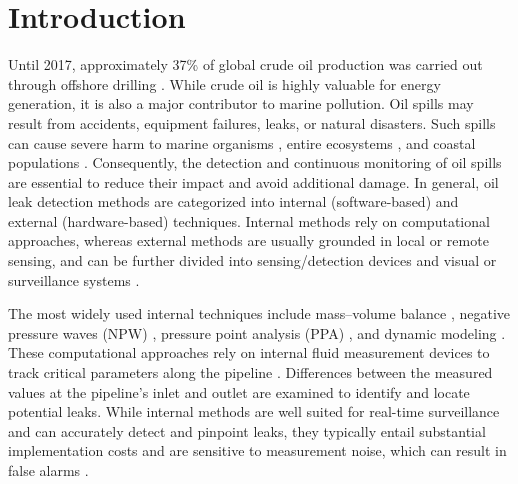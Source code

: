\documentclass{iopjournal}
\begin{document}
\section{Introduction}
Until 2017, approximately 37\% of global crude oil production was carried out through offshore drilling \cite{energyocean}. While crude oil is highly valuable for energy generation, it is also a major contributor to marine pollution. Oil spills may result from accidents, equipment failures, leaks, or natural disasters. Such spills can cause severe harm to marine organisms \cite{Almeda2014}, entire ecosystems \cite{Soloneski2015}, and coastal populations \cite{Albers1982}. Consequently, the detection and continuous monitoring of oil spills are essential to reduce their impact and avoid additional damage. In general, oil leak detection methods are categorized into internal (software-based) and external (hardware-based) techniques. Internal methods rely on computational approaches, whereas external methods are usually grounded in local or remote sensing, and can be further divided into sensing/detection devices and visual or surveillance systems \cite{cramer2015}.

The most widely used internal techniques include mass–volume balance \cite{martins2010assessment}, negative pressure waves (NPW) \cite{hou2013pipeline}, pressure point analysis (PPA) \cite{bin2011pressure}, and dynamic modeling \cite{vitkovsky2007experimental}. These computational approaches rely on internal fluid measurement devices to track critical parameters along the pipeline \cite{ostapkowicz2016leak}. Differences between the measured values at the pipeline’s inlet and outlet are examined to identify and locate potential leaks. While internal methods are well suited for real-time surveillance and can accurately detect and pinpoint leaks, they typically entail substantial implementation costs and are sensitive to measurement noise, which can result in false alarms \cite{reda2024roadmap}.
\end{document}
